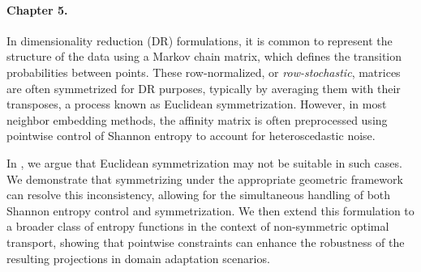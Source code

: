 \paragraph{Chapter 5.}  
In dimensionality reduction (DR) formulations, it is common to represent the structure of the data using a Markov chain matrix, which defines the transition probabilities between points. These row-normalized, or \emph{row-stochastic}, matrices are often symmetrized for DR purposes, typically by averaging them with their transposes, a process known as Euclidean symmetrization. However, in most neighbor embedding methods, the affinity matrix is often preprocessed using pointwise control of Shannon entropy to account for heteroscedastic noise.

In , we argue that Euclidean symmetrization may not be suitable in such cases. We demonstrate that symmetrizing under the appropriate geometric framework can resolve this inconsistency, allowing for the simultaneous handling of both Shannon entropy control and symmetrization. We then extend this formulation to a broader class of entropy functions in the context of non-symmetric optimal transport, showing that pointwise constraints can enhance the robustness of the resulting projections in domain adaptation scenarios.

